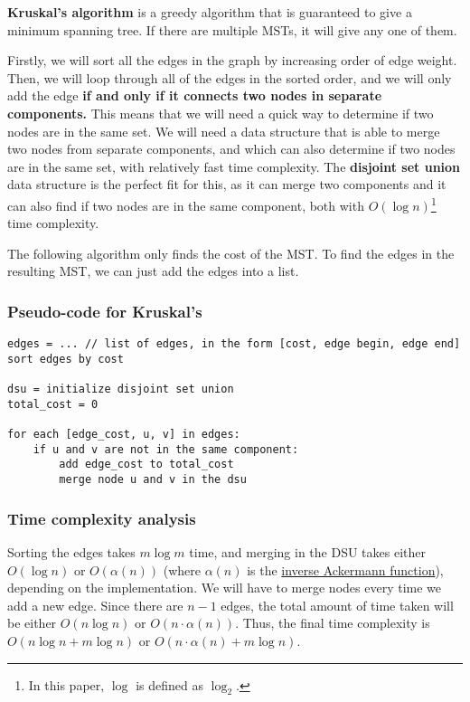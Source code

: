 \documentclass{article}
\begin{document}
\textbf{Kruskal's algorithm} is a greedy algorithm that is guaranteed to give a minimum spanning tree. If there are multiple MSTs, it will give any one of them.


Firstly, we will sort all the edges in the graph by increasing order of edge weight. Then, we will loop through all of the edges in the sorted order, and we will only add the edge \textbf{if and only if it connects two nodes in separate components.} This means that we will need a quick way to determine if two nodes are in the same set. We will need a data structure that is able to merge two nodes from separate components, and which can also determine if two nodes are in the same set, with relatively fast time complexity. The \textbf{disjoint set union} data structure is the perfect fit for this, as it can merge two components and it can also find if two nodes are in the same component, both with $O(\log n)$\footnote{In this paper, $\log$ is defined as $\log_2.$} time complexity.

The following algorithm only finds the cost of the MST. To find the edges in the resulting MST, we can just add the edges into a list.

\subsubsection{Pseudo-code for Kruskal's}
\begin{lstlisting}
edges = ... // list of edges, in the form [cost, edge begin, edge end]
sort edges by cost

dsu = initialize disjoint set union
total_cost = 0

for each [edge_cost, u, v] in edges:
    if u and v are not in the same component:
        add edge_cost to total_cost
        merge node u and v in the dsu
\end{lstlisting}

\subsubsection{Time complexity analysis}
Sorting the edges takes $m\log m$ time, and merging in the DSU takes either $O(\log n)$ or $O(\alpha(n))$ (where $\alpha(n)$ is the \href{https://en.wikipedia.org/wiki/Ackermann_function}{inverse Ackermann function}), depending on the implementation. We will have to merge nodes every time we add a new edge. Since there are $n - 1$ edges, the total amount of time taken will be either $O(n \log n)$ or $O(n \cdot \alpha(n))$. Thus, the final time complexity is $O(n\log n + m\log n)$ or $O(n \cdot \alpha(n) + m\log n)$.
\end{document}

